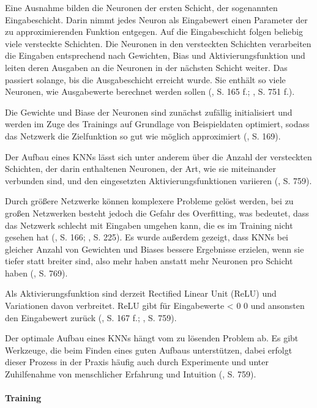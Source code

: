Eine Ausnahme bilden die Neuronen der ersten Schicht, der sogenannten Eingabeschicht. Darin nimmt jedes Neuron als Eingabewert einen Parameter der zu approximierenden Funktion entgegen. Auf die Eingabeschicht folgen beliebig viele versteckte Schichten. Die Neuronen in den versteckten Schichten verarbeiten die Eingaben entsprechend nach Gewichten, Bias und Aktivierungsfunktion und leiten deren Ausgaben an die Neuronen in der nächsten Schicht weiter. Das passiert solange, bis die Ausgabeschicht erreicht wurde. Sie enthält so viele Neuronen, wie Ausgabewerte berechnet werden sollen (\cite{Albrecht.2024}, S. 165 f.; \cite{Russell.2020}, S. 751 f.).

Die Gewichte und Biase der Neuronen sind zunächst zufällig initialisiert und werden im Zuge des Trainings auf Grundlage von Beispieldaten optimiert, sodass das Netzwerk die Zielfunktion so gut wie möglich approximiert (\cite{Albrecht.2024}, S. 169).


Der Aufbau eines KNNs lässt sich unter anderem über die Anzahl der versteckten Schichten, der darin enthaltenen Neuronen, der Art, wie sie miteinander verbunden sind, und den eingesetzten Aktivierungsfunktionen variieren (\cite{Russell.2020}, S. 759).

Durch größere Netzwerke können komplexere Probleme gelöst werden, bei zu großen Netzwerken besteht jedoch die Gefahr des Overfitting, was bedeutet, dass das Netzwerk schlecht mit Eingaben umgehen kann, die es im Training nicht gesehen hat (\cite{Albrecht.2024}, S. 166; \cite{Sutton.2018}, S. 225). Es wurde außerdem gezeigt, dass KNNs bei gleicher Anzahl von Gewichten und Biases bessere Ergebnisse erzielen, wenn sie tiefer statt breiter sind, also mehr haben anstatt mehr Neuronen pro Schicht haben (\cite{Russell.2020}, S. 769).

Als Aktivierungsfunktion sind derzeit Rectified Linear Unit (ReLU) und Variationen davon verbreitet. ReLU gibt für Eingabewerte < 0 0 und ansonsten den Eingabewert zurück (\cite{Albrecht.2024}, S. 167 f.; \cite{Russell.2020}, S. 759).

Der optimale Aufbau eines KNNs hängt vom zu lösenden Problem ab. Es gibt Werkzeuge, die beim Finden eines guten Aufbaus unterstützen, dabei erfolgt dieser Prozess in der Praxis häufig auch durch Experimente und unter Zuhilfenahme von menschlicher Erfahrung und Intuition (\cite{Russell.2020}, S. 759).

\paragraph{Training}


